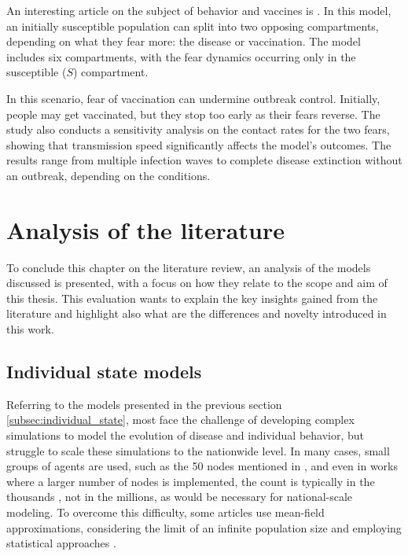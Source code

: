 An interesting article on the subject of behavior and vaccines is \cite{Epstein_2021}. In this model, an initially susceptible population can split into two opposing compartments, depending on what they fear more: the disease or vaccination. The model includes six compartments, with the fear dynamics occurring only in the susceptible ($S$) compartment.

In this scenario, fear of vaccination can undermine outbreak control. Initially, people may get vaccinated, but they stop too early as their fears reverse. The study also conducts a sensitivity analysis on the contact rates for the two fears, showing that transmission speed significantly affects the model’s outcomes. The results range from multiple infection waves to complete disease extinction without an outbreak, depending on the conditions.

\section{Analysis of the literature}
To conclude this chapter on the literature review, an analysis of the models discussed is presented, with a focus on how they relate to the scope and aim of this thesis. This evaluation wants to explain the key insights gained from the literature and highlight also what are the differences and novelty introduced in this work.

\subsection{Individual state models}
Referring to the models presented in the previous section \ref{subsec:individual_state}, most face the challenge of developing complex simulations to model the evolution of disease and individual behavior, but struggle to scale these simulations to the nationwide level. In many cases, small groups of agents are used, such as the 50 nodes mentioned in \cite{Nunner2021}, and even in works where a larger number of nodes is implemented, the count is typically in the thousands \cite{Granell2013}, not in the millions, as would be necessary for national-scale modeling. To overcome this difficulty, some articles use mean-field approximations, considering the limit of an infinite population size and employing statistical approaches \cite{Frieswijk_2022}.

